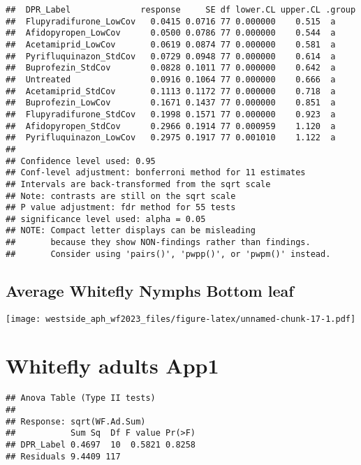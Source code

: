 \documentclass[
]{article}
\begin{document}
\begin{verbatim}
##  DPR_Label              response     SE df lower.CL upper.CL .group
##  Flupyradifurone_LowCov   0.0415 0.0716 77 0.000000    0.515  a    
##  Afidopyropen_LowCov      0.0500 0.0786 77 0.000000    0.544  a    
##  Acetamiprid_LowCov       0.0619 0.0874 77 0.000000    0.581  a    
##  Pyrifluquinazon_StdCov   0.0729 0.0948 77 0.000000    0.614  a    
##  Buprofezin_StdCov        0.0828 0.1011 77 0.000000    0.642  a    
##  Untreated                0.0916 0.1064 77 0.000000    0.666  a    
##  Acetamiprid_StdCov       0.1113 0.1172 77 0.000000    0.718  a    
##  Buprofezin_LowCov        0.1671 0.1437 77 0.000000    0.851  a    
##  Flupyradifurone_StdCov   0.1998 0.1571 77 0.000000    0.923  a    
##  Afidopyropen_StdCov      0.2966 0.1914 77 0.000959    1.120  a    
##  Pyrifluquinazon_LowCov   0.2975 0.1917 77 0.001010    1.122  a    
## 
## Confidence level used: 0.95 
## Conf-level adjustment: bonferroni method for 11 estimates 
## Intervals are back-transformed from the sqrt scale 
## Note: contrasts are still on the sqrt scale 
## P value adjustment: fdr method for 55 tests 
## significance level used: alpha = 0.05 
## NOTE: Compact letter displays can be misleading
##       because they show NON-findings rather than findings.
##       Consider using 'pairs()', 'pwpp()', or 'pwpm()' instead.
\end{verbatim}

\hypertarget{average-whitefly-nymphs-bottom-leaf}{%
\subsection{Average Whitefly Nymphs Bottom
leaf}\label{average-whitefly-nymphs-bottom-leaf}}

\texttt{[image: westside\_aph\_wf2023\_files/figure-latex/unnamed-chunk-17-1.pdf]}

\hypertarget{whitefly-adults-app1}{%
\section{Whitefly adults App1}\label{whitefly-adults-app1}}

\begin{verbatim}
## Anova Table (Type II tests)
## 
## Response: sqrt(WF.Ad.Sum)
##           Sum Sq  Df F value Pr(>F)
## DPR_Label 0.4697  10  0.5821 0.8258
## Residuals 9.4409 117
\end{verbatim}
\end{document}
